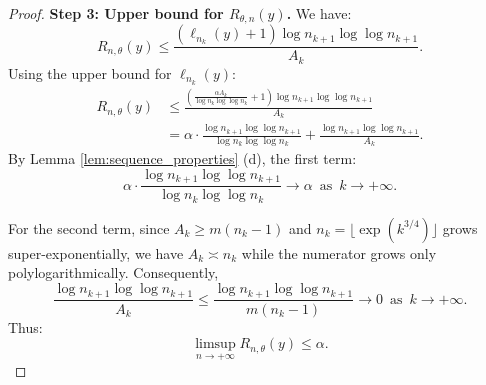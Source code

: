 \documentclass[10pt,a4paper]{amsart}
\begin{document}
\begin{proof}
\noindent \textbf{Step 3: Upper bound for $R_{\theta,n}(y)$.}
We have: 
\[
R_{n,\theta}(y) \leq \frac{(\ell_{n_k}(y) + 1) \log n_{k+1} \log \log n_{k+1}}{A_k}.
\]
Using the upper bound for $\ell_{n_k}(y)$:
\begin{align*}
R_{n,\theta}(y) &\leq \frac{\left( \frac{\alpha A_k}{\log n_k \log \log n_k} + 1 \right) \log n_{k+1} \log \log n_{k+1}}{A_k} \\
&= \alpha \cdot \frac{\log n_{k+1} \log \log n_{k+1}}{\log n_k \log \log n_k} + \frac{\log n_{k+1} \log \log n_{k+1}}{A_k}.
\end{align*}
%
By Lemma \ref{lem:sequence_properties} (d), the first term:
\[
\alpha \cdot \frac{\log n_{k+1} \log \log n_{k+1}}{\log n_k \log \log n_k} \to \alpha \, \mbox{ as } \, k \to +\infty. 
\]

For the second term, since $A_k \geq m(n_k - 1)$ and $n_k = \lfloor \exp(k^{3/4}) \rfloor$ grows super-exponentially, we have { $A_k \asymp n_k$ while the numerator grows only polylogarithmically. Consequently,}
\[
\frac{\log n_{k+1} \log \log n_{k+1}}{A_k} \leq \frac{\log n_{k+1} \log \log n_{k+1}}{m(n_k - 1)} \to 0 \, {\text{ as } \, k \to +\infty}.
\]
Thus:
\[
\limsup_{n \to +\infty} R_{n,\theta}(y) \leq \alpha.
\]
\end{proof}
\end{document}
